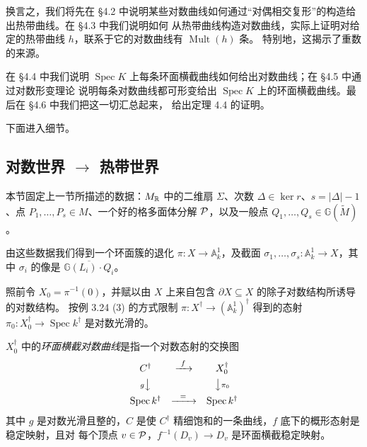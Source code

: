 换言之，我们将先在 §4.2 中说明某些对数曲线如何通过“对偶相交复形”的构造给出热带曲线。在 §4.3 中我们说明如何
从热带曲线构造对数曲线，实际上证明对给定的热带曲线 $h$，联系于它的对数曲线有 $\operatorname{Mult}(h)$ 条。
特别地，这揭示了重数的来源。

在 §4.4 中我们说明 $\operatorname{Spec}K$ 上每条环面横截曲线如何给出对数曲线；在 §4.5 中通过对数形变理论
说明每条对数曲线都可形变给出 $\operatorname{Spec}K$ 上的环面横截曲线。最后在 §4.6 中我们把这一切汇总起来，
给出定理 4.4 的证明。

下面进入细节。

\subsection{对数世界 $\to$ 热带世界}
本节固定上一节所描述的数据：$M_{\mathbb{R}}$ 中的二维扇 $\Sigma$、次数 $\Delta\in\ker r$、$s = |\Delta|-1$、点
$P_1,\dots,P_s \in M$、一个好的格多面体分解 $\mathcal{P}$，以及一般点
$Q_1,\dots,Q_s \in \mathbb{G}(\widetilde{M})$。

由这些数据我们得到一个环面簇的退化 $\pi : X \to \mathbb{A}^1_{k}$，及截面
$\sigma_1,\dots,\sigma_s : \mathbb{A}^1_{k} \to X$，其中 $\sigma_i$ 的像是
$\overline{\mathbb{G}(L_i)\cdot Q_i}$。

照前令 $X_0 = \pi^{-1}(0)$，并赋以由 $X$ 上来自包含 $\partial X \subseteq X$ 的除子对数结构所诱导的对数结构。
按例 3.24 (3) 的方式限制 $\pi : X^{\dagger} \to (\mathbb{A}^1_{k})^{\dagger}$ 得到的态射
$\pi_0 : X_0^{\dagger} \to \operatorname{Spec}k^{\dagger}$ 是对数光滑的。

\begin{definition}
$X_0^{\dagger}$ 中的\emph{环面横截对数曲线}是指一个对数态射的交换图
\[
\begin{array}{ccc}
C^{\dagger} & \xrightarrow{\ f\ } & X_0^{\dagger} \\[4pt]
{\scriptstyle g}\big\downarrow & & \big\downarrow{\scriptstyle \pi_0} \\[4pt]
\operatorname{Spec}k^{\dagger} & \xrightarrow{\ \ =\ \ } & \operatorname{Spec}k^{\dagger}
\end{array}
\]
其中 $g$ 是对数光滑且整的，$C$ 是使 $C^{\dagger}$ 精细饱和的一条曲线，$f$ 底下的概形态射是稳定映射，且对
每个顶点 $v\in\mathcal{P}$，$f^{-1}(D_v)\to D_v$ 是环面横截稳定映射。
\end{definition}


